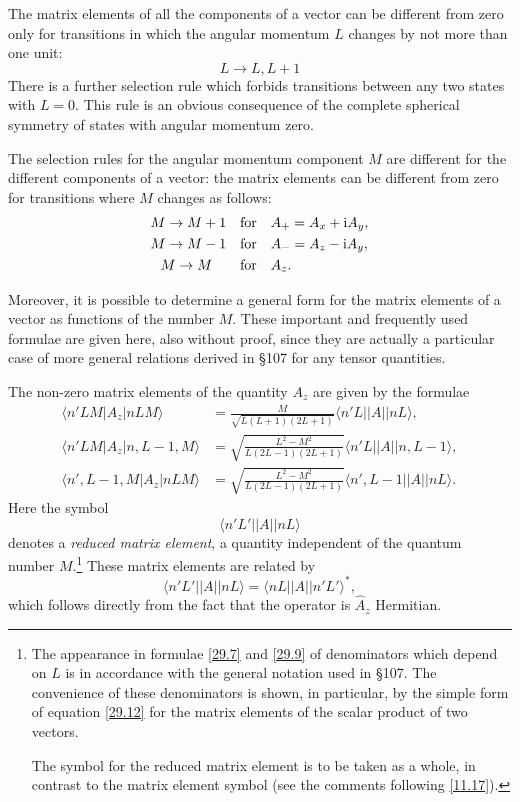 The matrix elements of all the components of a vector can be different from zero only for transitions in which the angular momentum $ L $ changes by not more than one unit:
\begin{equation}\label{29.5}
L\to L,L+1
\end{equation}
There is a further selection rule which forbids transitions between any two states with $ L = 0 $. This rule is an obvious consequence of the complete spherical symmetry of states with angular momentum zero.

The selection rules for the angular momentum component $ M $ are different for the different components of a vector: the matrix elements can be different from zero for transitions where $ M $ changes as follows:
\begin{equation}\label{29.6}
\begin{split}
M\to M+1\quad\text{for}\quad &A_+=A_x+\mathrm{i} A_y,\\
M\to M-1\quad\text{for}\quad &A_-=A_z-\mathrm{i} A_y,\\
M\to M\quad\quad\text{for}\quad&A_z.
\end{split}
\end{equation}


Moreover, it is possible to determine a general form for the matrix elements of a vector as functions of the number $ M $. These important and frequently used formulae are given here, also without proof, since they are actually a particular case of more general relations derived in \S107 for any tensor quantities.

The non-zero matrix elements of the quantity $ A_z $ are given by the formulae
\begin{equation}\label{29.7}
\begin{split}
\langle n'LM|A_z|nLM\rangle&=\frac{M}{\sqrt{L(L+1)(2L+1)}}\langle n'L||A||nL\rangle,\\
\langle n'LM|A_z|n,L-1,M\rangle&=\sqrt{\frac{L^2-M^2}{L(2L-1)(2L+1)}}\langle n'L||A||n,L-1\rangle,\\
\langle n',L-1,M|A_z|nLM\rangle&=\sqrt{\frac{L^2-M^2}{L(2L-1)(2L+1)}}\langle n',L-1||A||nL\rangle.
\end{split}
\end{equation}
Here the symbol \[ \langle
 n'L'||A||nL\rangle \] 
denotes a \textit{reduced matrix element}, a quantity independent of the quantum number $ M $.\footnote{The appearance in formulae \eqref{29.7} and \eqref{29.9} of denominators which depend on $ L $ is in accordance with the general notation used in \S107. The convenience of these denominators is shown, in particular, by the simple form of equation \eqref{29.12} for the matrix elements of the scalar product of two vectors.
	

The symbol for the reduced matrix element is to be taken as a whole, in contrast to the matrix element symbol (see the comments following \eqref{11.17}).
} These matrix elements are related by
\begin{equation}\label{29.8}
\langle
n'L'||A||nL\rangle=\langle
nL||A||n'L'\rangle^*,
\end{equation}
which follows directly from the fact that the operator is $\hat{A}_z$ Hermitian.

